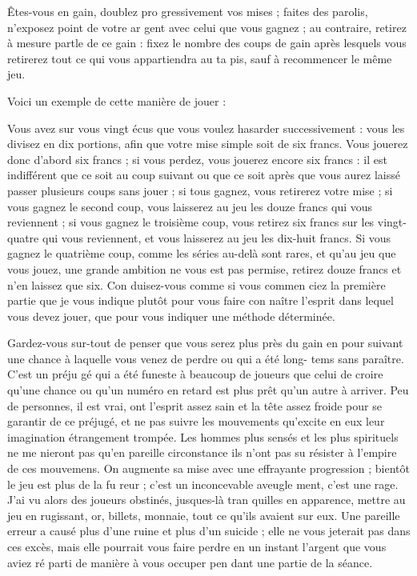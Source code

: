 Êtes-vous en gain, doublez pro%
gressivement vos mises ; faites des
parolis, n'exposez point de votre ar%
gent avec celui que vous gagnez ; au
contraire, retirez à mesure partle de
ce gain : fixez le nombre des coups
de gain après lesquels vous retirerez
tout ce qui vous appartiendra au ta%
pis, sauf à recommencer le même
jeu.

Voici un exemple de cette manière
de jouer :

Vous avez sur vous vingt écus que
vous voulez hasarder successivement :
vous les divisez en dix portions, afin
que votre mise simple soit de six
francs. Vous jouerez donc d'abord six
francs ; si vous perdez, vous jouerez
encore six francs : il est indifférent
que ce soit au coup suivant ou que
ce soit après que vous aurez laissé
passer plusieurs coups sans jouer ;
si tous gagnez, vous retirerez votre
mise ; si vous gagnez le second coup,
vous laisserez au jeu les douze francs
qui vous reviennent ; si vous gagnez
le troisième coup, vous retirez six
francs sur les vingt-quatre qui vous
reviennent, et vous laisserez au jeu
les dix-huit francs. Si vous gagnez
le quatrième coup, comme les séries
au-delà sont rares, et qu'au jeu que
vous jouez, une grande ambition ne
vous est pas permise, retirez douze
francs et n'en laissez que six. Con%
duisez-vous comme si vous commen%
ciez la première partie que je vous
indique plutôt pour vous faire con%
naître l'esprit dans lequel vous devez
jouer, que pour vous indiquer une
méthode déterminée.

Gardez-vous sur-tout de penser que
vous serez plus près du gain en pour%
suivant une chance à laquelle vous
venez de perdre ou qui a été long-%
tems sans paraître. C'est un préju%
gé qui a été funeste à beaucoup de
joueurs que celui de croire qu'une
chance ou qu'un numéro en retard
est plus prêt qu'un autre à arriver.
Peu de personnes, il est vrai, ont
l'esprit assez sain et la tête assez froide
pour se garantir de ce préjugé, et ne
pas suivre les mouvements qu'excite
en eux leur imagination étrangement
trompée. Les hommes plus sensés
et les plus spirituels ne me nieront
pas qu'en pareille circonstance ils
n'ont pas su résister à l'empire de ces
mouvemens. On augmente sa mise
avec une effrayante progression ;
bientôt le jeu est plus de la fu%
reur ; c'est un inconcevable aveugle%
ment, c'est une rage. J'ai vu alors des
joueurs obstinés, jusques-là tran%
quilles en apparence, mettre au jeu
en rugissant, or, billets, monnaie,
tout ce qu'ils avaient sur eux. Une
pareille erreur a causé plus d'une
ruine et plus d'un suicide ; elle ne
vous jeterait pas dans ces excès, mais
elle pourrait vous faire perdre en un
instant l'argent que vous aviez ré%
parti de manière à vous occuper pen%
dant une partie de la séance.

